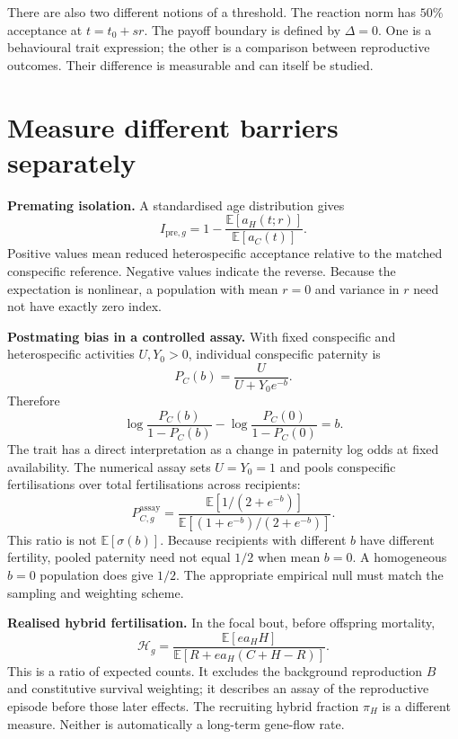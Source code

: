 \documentclass[11pt,a4paper]{article}
\newcommand{\E}{\mathbb E}
\newcommand{\sig}{\sigma}
\begin{document}
There are also two different notions of a threshold. The reaction norm has $50\%$ acceptance at $t=t_0+sr$. The payoff boundary is defined by $\Delta=0$. One is a behavioural trait expression; the other is a comparison between reproductive outcomes. Their difference is measurable and can itself be studied.

\section{Measure different barriers separately}
\textbf{Premating isolation.} A standardised age distribution gives
\begin{equation}
I_{\mathrm{pre},g}=1-\frac{\E[a_H(t;r)]}{\E[a_C(t)]}.
\end{equation}
Positive values mean reduced heterospecific acceptance relative to the matched conspecific reference. Negative values indicate the reverse. Because the expectation is nonlinear, a population with mean $r=0$ and variance in $r$ need not have exactly zero index.

\textbf{Postmating bias in a controlled assay.} With fixed conspecific and heterospecific activities $U,Y_0>0$, individual conspecific paternity is
\begin{equation}
P_C(b)=\frac{U}{U+Y_0e^{-b}}.
\end{equation}
Therefore
\begin{equation}
\log\frac{P_C(b)}{1-P_C(b)}
-\log\frac{P_C(0)}{1-P_C(0)}=b.
\end{equation}
The trait has a direct interpretation as a change in paternity log odds at fixed availability. The numerical assay sets $U=Y_0=1$ and pools conspecific fertilisations over total fertilisations across recipients:
\begin{equation}
P_{C,g}^{\mathrm{assay}}
=\frac{\E[1/(2+e^{-b})]}{\E[(1+e^{-b})/(2+e^{-b})]}.
\end{equation}
This ratio is not $\E[\sig(b)]$. Because recipients with different $b$ have different fertility, pooled paternity need not equal $1/2$ when mean $b=0$. A homogeneous $b=0$ population does give $1/2$. The appropriate empirical null must match the sampling and weighting scheme.

\textbf{Realised hybrid fertilisation.} In the focal bout, before offspring mortality,
\begin{equation}
\mathcal H_g=
\frac{\E[e a_H H]}{\E[R+e a_H(C+H-R)]}.
\end{equation}
This is a ratio of expected counts. It excludes the background reproduction $B$ and constitutive survival weighting; it describes an assay of the reproductive episode before those later effects. The recruiting hybrid fraction $\pi_H$ is a different measure. Neither is automatically a long-term gene-flow rate.
\end{document}
